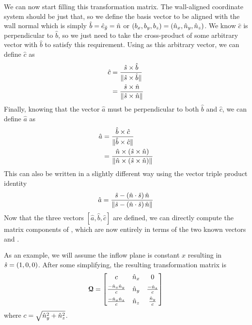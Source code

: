 \begin{itemize}[parsep=2.5\parsep]
    We can now start filling this transformation matrix.
    The wall-aligned coordinate system should be just that, so we define the
    \ywb{} basis vector to be aligned with the wall normal which is simply
    \(\hat{b}=\hat{e}_{\tilde{y}}=\hat{n}\) or \((b_x,b_y,b_z)=(\hat{n}_x,\hat{n}_y,\hat{n}_z)\).
    We know \(\hat{c}\) is perpendicular to \(\hat{b}\), so we just need to take
    the cross-product of some arbitrary vector with \(\hat{b}\) to satisfy this
    requirement.
    Using \innorm{} as this arbitrary vector, we can define \(\hat{c}\) as
    \begin{equation*}
      \begin{split}
        \hat{c} & = \frac{\hat{s}\times\hat{b}}{\|\hat{s}\times\hat{b}\|} \\
                & = \frac{\hat{s}\times\hat{n}}{\|\hat{s}\times\hat{n}\|}
      \end{split}
    \end{equation*}
    Finally, knowing that the vector \(\hat{a}\) must be perpendicular to both
    \(\hat{b}\) and \(\hat{c}\), we can define \(\hat{a}\) as
    \begin{equation*}
      \begin{split}
        \hat{a} & = \frac{\hat{b}\times\hat{c}}{\|\hat{b}\times\hat{c}\|} \\
                & = \frac{\normal\times(\innorm\times\normal)}%
                         {\|\normal\times(\innorm\times\normal)\|}
      \end{split}
    \end{equation*}
    This can also be written in a slightly different way using the vector triple
    product identity
    \begin{equation*}
      \hat{a} = \frac{\hat{s} - \left(\hat{n}\cdot\hat{s}\right)\hat{n}}
                     {\|\hat{s} - \left(\hat{n}\cdot\hat{s}\right)\hat{n}\|}
    \end{equation*}
    Now that the three vectors \([\hat{a},\hat{b},\hat{c}]\) are defined, we can
    directly compute the matrix components of \rmat, which are now entirely in
    terms of the two known vectors \normal{} and \innorm.


    As an example, we will assume the inflow plane is constant \(x\) resulting
    in \(\hat{s}=(1,0,0)\).
    After some simplifying, the resulting transformation matrix is
    \begin{equation*}
      \bm{\mathcal{Q}} =
      \begin{bmatrix}
        c                 & \hat{n}_x & 0 \\[1.0ex]
        \frac{-\hat{n}_x\hat{n}_y}{c} & \hat{n}_y & \frac{-\hat{n}_z}{c} \\[1.0ex]
        \frac{-\hat{n}_x\hat{n}_z}{c} & \hat{n}_z & \frac{ \hat{n}_y}{c}
      \end{bmatrix}
    \end{equation*}
    where \(c = \sqrt{ \hat{n}_y^2 + \hat{n}_z^2 }\).
    

\end{itemize}
